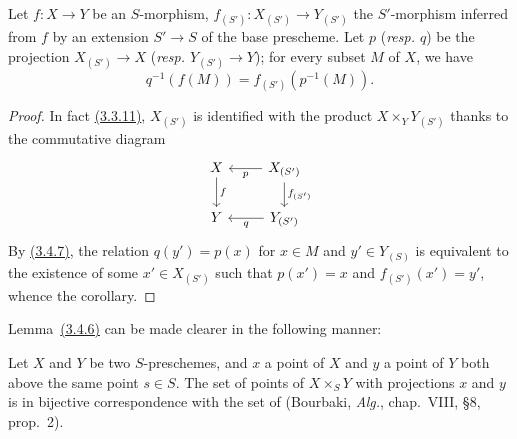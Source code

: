 \begin{cor}[3.4.8]
\label{cor-1.3.4.8}
Let $f\colon X\to Y$ be an $S$-morphism, $f_{(S')}\colon X_{(S')}\to Y_{(S')}$ the $S'$-morphism inferred from $f$ by an extension $S'\to S$ of the base prescheme.
Let $p$ (\emph{resp. $q$}) be the projection $X_{(S')}\to X$ (\emph{resp. $Y_{(S')}\to Y$}); for every subset $M$ of $X$, we have
\begin{equation*}
    q^{-1}(f(M)) = f_{(S')}(p^{-1}(M)).
\end{equation*}
\end{cor}

\begin{proof}
\label{proof-cor-1.3.4.8}
In fact \hyperref[cor-1.3.3.11]{(3.3.11)}, $X_{(S')}$ is identified with the product $X\times_Y Y_{(S')}$ thanks to the commutative diagram
\begin{equation*}
    \begin{tikzcd}
        X \ar[d, "f"]
        & X_{(S')} \ar[l, "p"] \ar[d, "f_{(S')}"]\\
        Y
        & Y_{(S')} \ar[l, "q"]
    \end{tikzcd}
\end{equation*}
By \hyperref[prop-1.3.4.7]{(3.4.7)}, the relation $q(y')=p(x)$ for $x\in M$ and $y'\in Y_{(S)}$ is equivalent to the existence of some $x'\in X_{(S')}$ such that $p(x')=x$ and $f_{(S')}(x')=y'$, whence the corollary.
\end{proof}

Lemma~\hyperref[lem-1.3.4.6]{(3.4.6)} can be made clearer in the following manner:
\begin{prop}[3.4.9]
\label{prop-1.3.4.9}
Let $X$ and $Y$ be two $S$-preschemes, and $x$ a point of $X$ and $y$ a point of $Y$ both above the same point $s\in S$.
The set of points of $X\times_S Y$ with projections $x$ and $y$ is in bijective correspondence with the set of  (Bourbaki, \emph{Alg.}, chap.~VIII, §8, prop.~2).
\end{prop}

